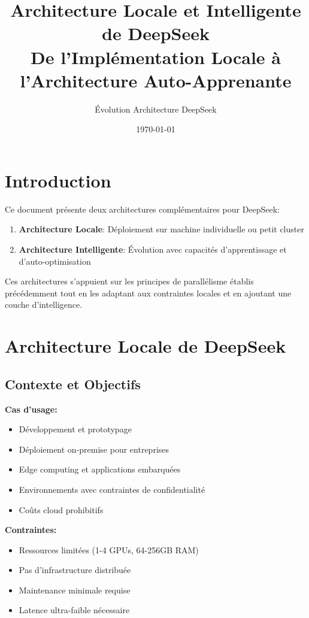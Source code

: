 \documentclass[12pt,a4paper]{article}
\title{\textbf{Architecture Locale et Intelligente de DeepSeek} \\ 
       \large De l'Implémentation Locale à l'Architecture Auto-Apprenante}
\author{Évolution Architecture DeepSeek}
\date{\today}
\begin{document}
\maketitle
\tableofcontents
\newpage

\section{Introduction}

Ce document présente deux architectures complémentaires pour DeepSeek:
\begin{enumerate}
    \item \textbf{Architecture Locale}: Déploiement sur machine individuelle ou petit cluster
    \item \textbf{Architecture Intelligente}: Évolution avec capacités d'apprentissage et d'auto-optimisation
\end{enumerate}

Ces architectures s'appuient sur les principes de parallélisme établis précédemment tout en les adaptant aux contraintes locales et en ajoutant une couche d'intelligence.

\section{Architecture Locale de DeepSeek}

\subsection{Contexte et Objectifs}

\textbf{Cas d'usage:}
\begin{itemize}
    \item Développement et prototypage
    \item Déploiement on-premise pour entreprises
    \item Edge computing et applications embarquées
    \item Environnements avec contraintes de confidentialité
    \item Coûts cloud prohibitifs
\end{itemize}

\textbf{Contraintes:}
\begin{itemize}
    \item Ressources limitées (1-4 GPUs, 64-256GB RAM)
    \item Pas d'infrastructure distribuée
    \item Maintenance minimale requise
    \item Latence ultra-faible nécessaire
\end{itemize}
\end{document}
